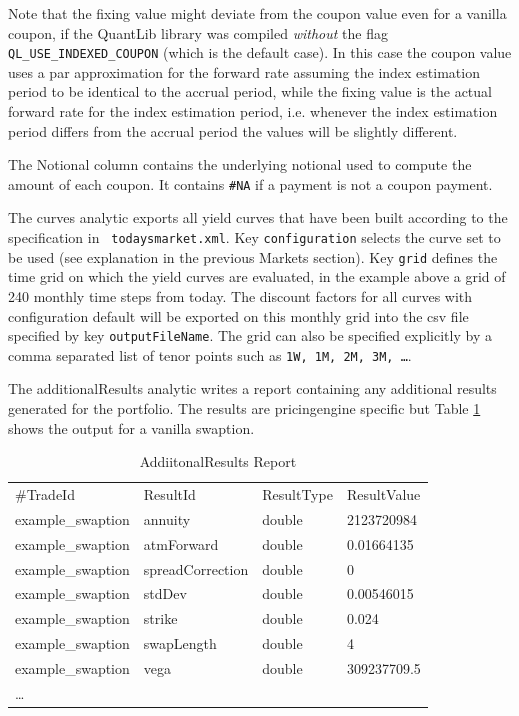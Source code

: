 \documentclass[12pt, a4paper]{article}
\begin{document}
{Note that the fixing value might deviate from the coupon value even for a vanilla coupon, if the QuantLib library was
compiled {\em without} the flag \verb+QL_USE_INDEXED_COUPON+ (which is the default case). In this case the coupon value
uses a par approximation for the forward rate assuming the index estimation period to be identical to the accrual
period, while the fixing value is the actual forward rate for the index estimation period, i.e. whenever the index estimation
period differs from the accrual period the values will be slightly different.

The Notional column contains the underlying notional used to compute the amount of each coupon. It contains \verb+#NA+
if a payment is not a coupon payment.

The curves analytic exports all yield curves that have been built according to the specification in {\tt
  todaysmarket.xml}. Key {\tt configuration} selects the curve set to be used (see explanation in the previous Markets
section).  Key {\tt grid} defines the time grid on which the yield curves are evaluated, in the example above a grid of
240 monthly time steps from today. The discount factors for all curves with configuration default will be exported on
this monthly grid into the csv file specified by key {\tt outputFileName}. The grid can also be specified explicitly by
a comma separated list of tenor points such as {\tt 1W, 1M, 2M, 3M, \dots}.

The additionalResults analytic writes a report containing any additional results generated for the portfolio. The results are pricingengine specific but Table \ref{additionalreport} shows the output for a vanilla swaption.

\begin{table}[hbt]
\scriptsize
\begin{center}
  \begin{tabular}{l|l|l|l}
\hline
\#TradeId & ResultId & ResultType & ResultValue \\
example\_swaption & annuity & double & 2123720984 \\
example\_swaption & atmForward & double & 0.01664135 \\
example\_swaption & spreadCorrection & double & 0 \\
example\_swaption & stdDev & double & 0.00546015 \\
example\_swaption & strike & double & 0.024 \\
example\_swaption & swapLength & double & 4 \\
example\_swaption & vega & double & 309237709.5 \\
\hline
\hline
\ldots
\end{tabular}
\caption{AddiitonalResults Report}
\label{additionalreport}
\end{center}
\end{table}

}
\end{document}
